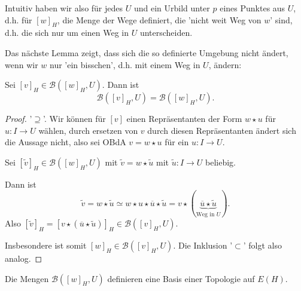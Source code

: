 \begin{remark*}
    Intuitiv haben wir also für jedes $U$ und ein Urbild unter  $p$ eines Punktes aus  $U$, d.h. für  $[w]_H$, die Menge der Wege definiert, die 'nicht weit Weg von  $w$' sind, d.h. die sich nur um einen Weg in  $U$ unterscheiden. 

    Das nächste Lemma zeigt, dass sich die so definierte Umgebung nicht ändert, wenn wir $w$ nur 'ein bisschen', d.h. mit einem Weg in  $U$, ändern:
\end{remark*}

\begin{lemma}\label{lm:b-umgebungen-in-e-h-sind-gleich-für-wege-die-sich-nur-um-weg-in-u-unterscheiden-bzw-invariant-unter-ersetzung-durch-element-der-umgebung}
    Sei $[v]_H\in \mathcal{B}([w]_H,U)$. Dann ist
    \[
        \mathcal{B}([v]_H,U) = \mathcal{B}([w]_H,U)
    .\] 
\end{lemma}

\begin{proof}
    '$\supseteq$'. Wir können für $[v]$ einen Repräsentanten der Form $w \star u$ für  $u\colon  I \to U$ wählen, durch ersetzen von $v$ durch diesen Repräsentanten ändert sich die Aussage nicht, also sei OBdA  $v = w \star u$ für ein  $u\colon  I \to  U$.

    Sei $[\tilde{v}]_H \in \mathcal{B}([w]_H,U)$ mit $\tilde{v} = w \star \tilde{u}$ mit $\tilde{u}\colon  I \to  U$ beliebig.

    Dann ist
    \[
        \tilde{v} = w \star \tilde{u} \simeq w \star u \star \overline{u} \star \tilde{u} = v \star (\underbrace{\overline{u} \star \tilde{u}}_{\text{Weg in $U$}})
    .\] 
    Also $[\tilde{v}]_H = [v \star (\overline{u} \star \tilde{u})]_H \in \mathcal{B}([v]_H, U)$.

    Insbesondere ist somit $[w]_H \in  \mathcal{B}([v]_H, U)$. Die Inklusion '$\subset $' folgt also analog.
\end{proof}

\begin{propositiondef}
    Die Mengen $\mathcal{B}([w]_H, U)$ definieren eine Basis einer Topologie auf $E(H)$.
\end{propositiondef}

